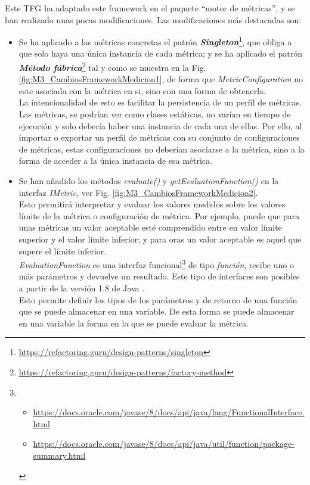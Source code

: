 Este TFG ha adaptado este framework en el paquete ``motor de métricas'', y se han realizado unas pocas modificaciones. Las modificaciones más destacadas son:
\begin{itemize}
	\tightlist
	\item Se ha aplicado a las métricas concretas el patrón \textit{\textbf{Singleton}}\footnote{\url{https://refactoring.guru/design-patterns/singleton}}, que obliga a que solo haya una única instancia de cada métrica; y se ha aplicado el patrón \textit{\textbf{Método fábrica}}\footnote{\url{https://refactoring.guru/design-patterns/factory-method}} tal y como se muestra en la Fig. \ref{fig:M3_CambiosFrameworkMedicion1}, de forma que \textit{MetricConfiguration} no este asociada con la métrica en si, sino con una forma de obtenerla.\\
	La intencionalidad de esto es facilitar la persistencia de un perfil de métricas. Las métricas, se podrían ver como clases estáticas, no varían en tiempo de ejecución y solo debería haber una instancia de cada una de ellas. Por ello, al importar o exportar un perfil de métricas con su conjunto de configuraciones de métricas, estas configuraciones no deberían asociarse a la métrica, sino a la forma de acceder a la única instancia de esa métrica. 
	\item Se han añadido los métodos \textit{evaluate()} y \textit{getEvaluationFunction()} en la interfaz \textit{IMetric}, ver Fig. \ref{fig:M3_CambiosFrameworkMedicion2}.\\
	Esto permitirá interpretar y evaluar los valores medidos sobre los valores límite de la métrica o configuración de métrica. Por ejemplo, puede que para unas métricas un valor aceptable esté comprendido entre en valor límite superior y el valor límite inferior; y para oras un valor aceptable es aquel que supere el límite inferior.\\
	\textit{EvaluationFunction} es una interfaz funcional\footnote{
		\begin{itemize}
			\tightlist
			\item \url{https://docs.oracle.com/javase/8/docs/api/java/lang/FunctionalInterface.html}
			\item \url{https://docs.oracle.com/javase/8/docs/api/java/util/function/package-summary.html}
		\end{itemize}} 
	de tipo \textit{función}, recibe uno o más parámetros y devuelve un resultado. Este tipo de interfaces son posibles a partir de la versión 1.8 de Java \cite{noauthor_functionalinterface_nodate}.\\
	Esto permite definir los tipos de los parámetros y de retorno de una función que se puede almacenar en una variable. De esta forma se puede almacenar en una variable la forma en la que se puede evaluar la métrica.
\end{itemize}

